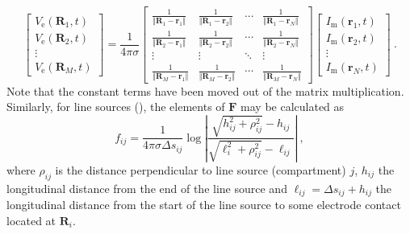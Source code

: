 \begin{equation}
\begin{bmatrix}
V_\text{e}(\mathbf{R}_1, t) \\
V_\text{e}(\mathbf{R}_2, t) \\
\vdots \\
V_\text{e}(\mathbf{R}_M, t)
\end{bmatrix}
= \frac{1}{4\pi\sigma}
\begin{bmatrix}
\frac{1}{\Vert\mathbf{R}_1 - \mathbf{r}_1\Vert} & \frac{1}{\Vert\mathbf{R}_1 - \mathbf{r}_2\Vert} & \cdots & \frac{1}{\Vert\mathbf{R}_1 - \mathbf{r}_N\Vert} \\
\frac{1}{\Vert\mathbf{R}_2 - \mathbf{r}_1\Vert} & \frac{1}{\Vert\mathbf{R}_2 - \mathbf{r}_2\Vert} & \cdots & \frac{1}{\Vert\mathbf{R}_2 - \mathbf{r}_N\Vert} \\
\vdots & \vdots & \ddots & \vdots \\
\frac{1}{\Vert\mathbf{R}_M - \mathbf{r}_1\Vert} & \frac{1}{\Vert\mathbf{R}_M - \mathbf{r}_2\Vert} & \cdots & \frac{1}{\Vert\mathbf{R}_M - \mathbf{r}_N\Vert}
\end{bmatrix}
\begin{bmatrix}
I_\text{m}(\mathbf{r}_1, t) \\
I_\text{m}(\mathbf{r}_2, t) \\
\vdots \\
I_\text{m}(\mathbf{r}_N, t)
\end{bmatrix} ~.
\end{equation}
%
Note that the constant terms have been moved out of the matrix multiplication.
Similarly, for line sources (), the elements of $\mathbf{F}$ may be calculated as
%
\begin{equation}
f_{ij} = \frac{1}{4\pi \sigma \Delta s_{ij}} \log \left| \frac{\sqrt{h_{ij}^2+\rho_{ij}^2}-h_{ij}}{\sqrt{\ell_i^2+\rho_{ij}^2}-\ell_{ij}} \right| ~,
\label{eq:LFPy:linesources}
\end{equation}
%
where $\rho_{ij}$ is the distance perpendicular to line source (compartment) $j$,
$h_{ij}$ the longitudinal distance from the end of the line source
and $\ell_{ij} = \Delta s_{ij} + h_{ij}$ the longitudinal distance from the start of the line source  to some electrode contact located at $\mathbf{R}_i$.

